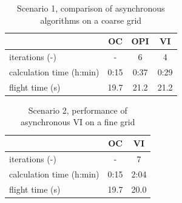 \begin{table}[htb]
	\begin{center}
		\begin{tabular}{l|c c c}
			& OC & OPI & VI \\ \hline
			iterations (-) & - & 6 & 4 \\
			calculation time (h:min) & 0:15 & 0:37 & 0:29  \\
			flight time (s) & 19.7 & 21.2 & 21.2
		\end{tabular}
		\caption{Scenario 1, comparison of asynchronous algorithms on a coarse grid}
		\label{tab:2d_flight_data_500m_async}
	\end{center}
\end{table}
\begin{table}[htb]
	\begin{center}
		\begin{tabular}{l|c c}
			& OC & VI \\ \hline
			iterations (-) & - & 7 \\
			calculation time (h:min) & 0:15 & 2:04 \\
			flight time (s) & 19.7 & 20.0
		\end{tabular}
		\caption{Scenario 2, performance of asynchronous VI on a fine grid}
		\label{tab:2d_flight_data_500m_async_fine_grid}
	\end{center}
\end{table}
